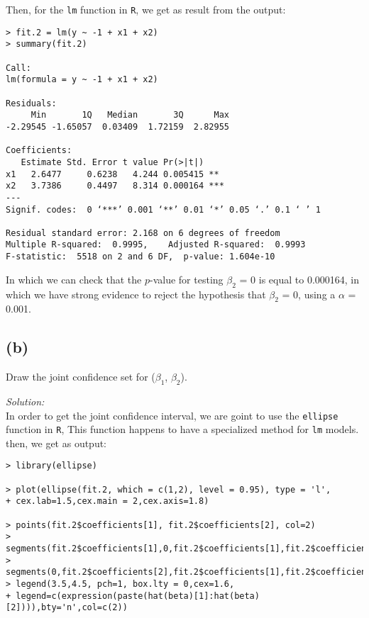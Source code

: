 \documentclass[a4paper, 11pt]{article}
\begin{document}
Then, for the \texttt{lm} function in \texttt{R}, we get as result from the output:
\begin{verbatim}
> fit.2 = lm(y ~ -1 + x1 + x2)
> summary(fit.2)

Call:
lm(formula = y ~ -1 + x1 + x2)

Residuals:
     Min       1Q   Median       3Q      Max 
-2.29545 -1.65057  0.03409  1.72159  2.82955 

Coefficients:
   Estimate Std. Error t value Pr(>|t|)    
x1   2.6477     0.6238   4.244 0.005415 ** 
x2   3.7386     0.4497   8.314 0.000164 ***
---
Signif. codes:  0 ‘***’ 0.001 ‘**’ 0.01 ‘*’ 0.05 ‘.’ 0.1 ‘ ’ 1

Residual standard error: 2.168 on 6 degrees of freedom
Multiple R-squared:  0.9995,	Adjusted R-squared:  0.9993 
F-statistic:  5518 on 2 and 6 DF,  p-value: 1.604e-10

\end{verbatim}

In which we can check that the $p$-value for testing $\beta_2$ = 0 is equal to 0.000164, in which we have strong evidence to reject the hypothesis that $\beta_2$ = 0, using a $\alpha$ = 0.001.

\subsection*{(b)} Draw the joint confidence set for ($\beta_1$, $\beta_2$). 

\noindent
\textit{Solution:}\\

In order to get the joint confidence interval, we are goint to use the \texttt{ellipse} function in \texttt{R}, This function happens to have a specialized method for \texttt{lm} models. then, we get as output:

\begin{verbatim}
> library(ellipse)

> plot(ellipse(fit.2, which = c(1,2), level = 0.95), type = 'l', 
+ cex.lab=1.5,cex.main = 2,cex.axis=1.8)

> points(fit.2$coefficients[1], fit.2$coefficients[2], col=2)
> segments(fit.2$coefficients[1],0,fit.2$coefficients[1],fit.2$coefficients[2])
> segments(0,fit.2$coefficients[2],fit.2$coefficients[1],fit.2$coefficients[2])
> legend(3.5,4.5, pch=1, box.lty = 0,cex=1.6, 
+ legend=c(expression(paste(hat(beta)[1]:hat(beta)[2]))),bty='n',col=c(2))

\end{verbatim}
\end{document}
